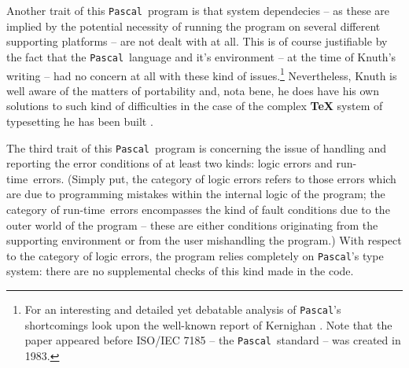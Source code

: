 \documentclass[a4paper,11pt]{article}
\renewcommand{\=}{\protect\nobreakdash-\hspace{0pt}}
\renewcommand{\~}{\protect\nobreakdash--\hspace{0pt}}
\newcommand{\pascal}{\code{Pascal}}
\newcommand{\code}[1]{{\tt{#1}}}
\newcommand\code*[1]{\mbox{\code{#1}}}
\newcommand{\pp}[2]{pp.~#1\~#2}
\newcommand{\pag}[1]{page~#1}
\newcommand{\para}[1]{\mbox{\S\hspace{1pt}#1}}
\newcommand{\parapag}[3][]{%
	\ifthenelse{\not\equal{#1}{}}{%
		\para{#2}, \emph{#1}, on \pag{#3}%
	}{%
		\para{#2} on \pag{#3}%
	}%
}
\newcommand{\runtime}{run\=time}
\begin{document}
Another trait of this \pascal\ program is that system dependecies -- as these
are implied by the potential necessity of running the program on several different
supporting platforms -- are not dealt with at all. This is of course justifiable
by the fact that the \pascal\ language and it's environment -- at the time of
Knuth's writing -- had no concern at all with these kind of issues.\footnote{For
an interesting and detailed yet debatable analysis of \pascal's shortcomings
look upon the well-known report of Kernighan \cite{kernighan:pascal}. Note that
the paper appeared before ISO/IEC 7185 -- the \pascal\ standard -- was created
in 1983.} Nevertheless, Knuth is well aware of the matters of portability and,
nota bene, he does have his own solutions to such kind of difficulties in the
case of the complex \textbf{\TeX} system of typesetting he has been built
\cite[ch.~4, sec.~\emph{Portability}, \pp{122}{124}]{knuth:literate}.

The third trait of this \pascal\ program is concerning the issue of handling and
reporting the error conditions of at least two kinds: logic errors and \runtime\
errors. (Simply put, the category of logic errors refers to those errors which
are due to programming mistakes within the internal logic of the program; the
category of \runtime\ errors encompasses the kind of fault conditions due to
the outer world of the program -- these are either conditions originating
from the supporting environment or from the user mishandling the program.)
With respect to the category of logic errors, the program relies completely on
\pascal's type system: there are no supplemental checks of this kind made
in the code.
%
%
%
%
\end{document}

